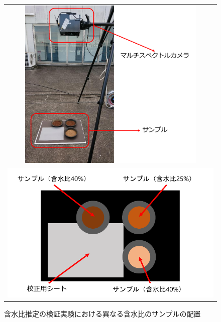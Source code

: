 \begin{figure}[p]
	\begin{center}
		\begin{tabular}{c}

			\begin{minipage}[t]{\linewidth}
			\hspace{3cm}\includegraphics[width=9cm]{./Ch4_WaterContentEstimation/Fig/watercontent_estimation_experiment_setting_compressed.pdf}
			\caption{含水比推定の検証実験における撮影機材の配置}\label{fig:watercontent_estimation_experiment_setting}
			\vspace{2cm}
			\end{minipage}

			\\

			\begin{minipage}[b]{\linewidth}
			\centering
			\includegraphics[width=12cm]{./Ch4_WaterContentEstimation/Fig/watercontent_estimation_experiment_sample_arrangement_compressed.pdf}
			\caption{含水比推定の検証実験における異なる含水比のサンプルの配置}\label{fig:watercontent_estimation_experiment_sample_arrangement}
			\end{minipage}

		\end{tabular}
	\end{center}
\end{figure}


